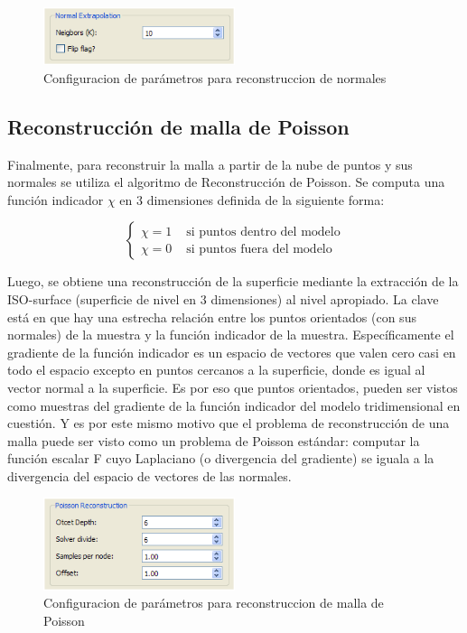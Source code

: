 \begin{figure}[H]
  \centering
    \includegraphics[width=0.5\textwidth]{./Cap6_reconstruccion/malla-normalextrapolation.png}
  \caption{Configuracion de parámetros para reconstruccion de normales}
  \label{fig:Mesh-Normals}
\end{figure}

\subsection{Reconstrucción de malla de Poisson}

Finalmente, para reconstruir la malla a partir de la nube de puntos y sus normales se utiliza el algoritmo de Reconstrucción de Poisson.
Se computa una función indicador $\chi$ en 3 dimensiones definida de la siguiente forma:

$$
\left\{ \begin{array}{rl}
 \chi = 1 & \mbox{ si puntos dentro del modelo} \\
 \chi = 0 & \mbox{ si puntos fuera del modelo}
       \end{array} \right.
$$

Luego, se obtiene una reconstrucción de la superficie mediante la extracción de la ISO-surface (superficie de nivel en 3 dimensiones) al nivel apropiado.
La clave está en que hay una estrecha relación entre los puntos orientados (con sus normales) de la muestra y la función indicador de la muestra. Específicamente el gradiente de la función indicador es un espacio de vectores que valen cero casi en todo el espacio excepto en puntos cercanos a la superficie, donde es igual al vector normal a la superficie.
Es por eso que puntos orientados, pueden ser vistos como muestras del gradiente de la función indicador del modelo tridimensional en cuestión. Y es por este mismo motivo que el problema de reconstrucción de una malla puede ser visto como un problema de Poisson estándar: computar la función escalar F cuyo Laplaciano (o divergencia del gradiente) se iguala a la divergencia del espacio de vectores de las normales.

\begin{figure}[H]
  \centering
    \includegraphics[width=0.5\textwidth]{./Cap6_reconstruccion/malla-poissonreconstruction.png}
  \caption{Configuracion de parámetros para reconstruccion de malla de Poisson}
  \label{fig:Mesh-Normals}
\end{figure}

